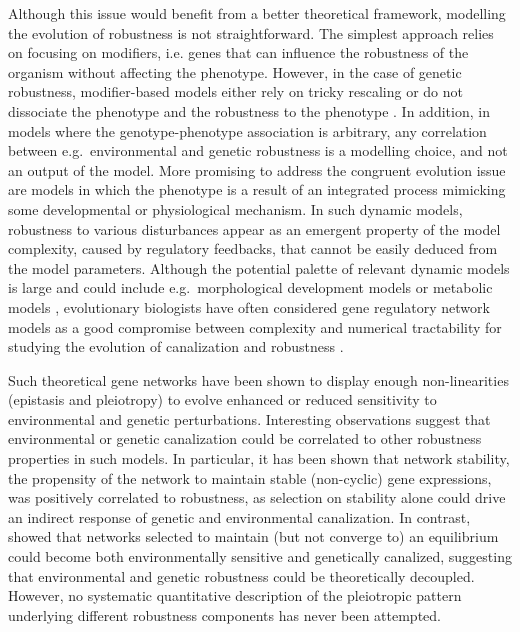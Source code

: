 \documentclass[10pt,a4paper]{article}
\begin{document}
Although this issue would benefit from a better theoretical framework, modelling the evolution of robustness is not straightforward. The simplest approach relies on focusing on modifiers, i.e. genes that can influence the robustness of the organism without affecting the phenotype. However, in the case of genetic robustness, modifier-based models either rely on tricky rescaling or do not dissociate the phenotype and the robustness to the phenotype \citep{WBB97, Kaw00, RM13}. In addition, in models where the genotype-phenotype association is arbitrary, any correlation between e.g.\ environmental and genetic robustness is a modelling choice, and not an output of the model. More promising to address the congruent evolution issue are models in which the phenotype is a result of an integrated process mimicking some developmental or physiological mechanism. In such dynamic models, robustness to various disturbances appear as an emergent property of the model complexity, caused by regulatory feedbacks, that cannot be easily deduced from the model parameters. Although the potential palette of relevant dynamic models is large and could include e.g.\ morphological development models \citep{MS20} or metabolic models \citep{NBR19}, evolutionary biologists have often considered gene regulatory network models as a good compromise between complexity and numerical tractability for studying the evolution of canalization and robustness \citep{Kau69,Wag94,SBB00,LP12}.

Such theoretical gene networks have been shown to display enough non-linearities (epistasis and pleiotropy) to evolve enhanced or reduced sensitivity to environmental \citep{Mas04,EMW11,EMW11b} and genetic \citep{Wag96,BS03,DW08,ALS+06,RL16} perturbations. Interesting observations suggest that environmental or genetic canalization could be correlated to other robustness properties in such models. In particular, it has been shown that network stability, the propensity of the network to maintain stable (non-cyclic) gene expressions, was positively correlated to robustness, as selection on stability alone could drive an indirect response of genetic \citep{SB02} and environmental \citep{Mas04} canalization. In contrast, \citealp{ORL18} showed that networks selected to maintain (but not converge to) an equilibrium could become both environmentally sensitive and genetically canalized, suggesting that environmental and genetic robustness could be theoretically decoupled. However, no systematic quantitative description of the pleiotropic pattern underlying different robustness components has never been attempted. 
\end{document}

